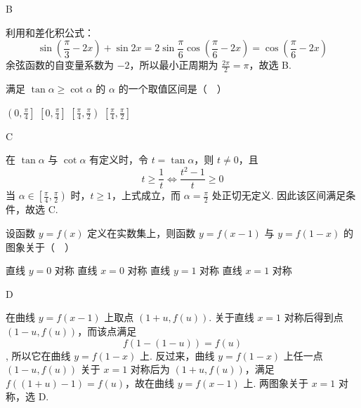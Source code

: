 \documentclass[UTF8,a4paper,oneside,11pt]{ctexbook}
\begin{document}
\begin{answer}
B
\end{answer}

\begin{solution}
利用和差化积公式：
\[
\sin\left(\frac\pi3-2x\right)+\sin2x
=2\sin\frac\pi6\cos\left(\frac\pi6-2x\right)
=\cos\left(\frac\pi6-2x\right)
\]
余弦函数的自变量系数为 \(-2\)，所以最小正周期为 \(\frac{2\pi}{2}=\pi\)，故选 B.
\end{solution}

\begin{problem}
满足 \(\tan \alpha \geqslant \cot \alpha\) 的 \(\alpha\) 的一个取值区间是（\(\quad\)）

\choices
    {\(\left(0, \frac{\pi}{4}\right]\)}
    {\(\left[0, \frac{\pi}{4}\right]\)}
    {\(\left[\frac{\pi}{4}, \frac{\pi}{2}\right)\)}
    {\(\left[\frac{\pi}{4}, \frac{\pi}{2}\right]\)}

\end{problem}

\begin{answer}
C
\end{answer}

\begin{solution}
在 \(\tan\alpha\) 与 \(\cot\alpha\) 有定义时，令 \(t=\tan\alpha\)，则 \(t\ne0\)，且
\[
t\geqslant\frac1t
\iff \frac{t^2-1}{t}\geqslant0
\]
当 \(\alpha\in\left[\frac\pi4,\frac\pi2\right)\) 时，\(t\geqslant1\)，上式成立，而 \(\alpha=\frac\pi2\) 处正切无定义. 因此该区间满足条件，故选 C.
\end{solution}

\begin{problem}
设函数 \(y = f(x)\) 定义在实数集上，则函数 \(y = f(x - 1)\) 与 \(y = f(1 - x)\) 的图象关于（\(\quad\)）

\choices
    {直线 \(y = 0\) 对称}
    {直线 \(x = 0\) 对称}
    {直线 \(y = 1\) 对称}
    {直线 \(x = 1\) 对称}

\end{problem}

\begin{answer}
D
\end{answer}

\begin{solution}
在曲线 \(y=f(x-1)\) 上取点 \((1+u,f(u))\). 关于直线 \(x=1\) 对称后得到点 \((1-u,f(u))\)，而该点满足
\[
f(1-(1-u))=f(u)
\],
所以它在曲线 \(y=f(1-x)\) 上. 反过来，曲线 \(y=f(1-x)\) 上任一点 \((1-u,f(u))\) 关于 \(x=1\) 对称后为 \((1+u,f(u))\)，满足 \(f((1+u)-1)=f(u)\)，故在曲线 \(y=f(x-1)\) 上. 两图象关于 \(x=1\) 对称，选 D.
\end{solution}
\end{document}
